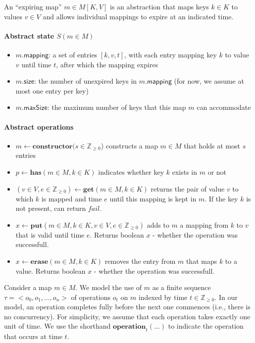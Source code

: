 \documentclass{article}
\renewcommand{\o}[1]{\ensuremath{\mathbf{#1}}}
\newcommand{\s}[1]{\ensuremath{\mathsf{#1}}}
\newcommand{\nintset}{\ensuremath{\mathds{Z}_{\ge 0}}}
\begin{document}
An ``expiring map'' $m \in M[K,V]$ is an abstraction that maps keys $k \in K$ to values $v \in V$ and allows individual mappings to expire at an indicated time.

\paragraph{Abstract state $S(m\in M)$}
\begin{itemize}
   \item $m$.\s{mapping}: a set of entries $[k,v,t]$, with each entry mapping key $k$ to value $v$ until time $t$, after which the mapping expires
   \item $m$.\s{size}: the number of unexpired keys in $m$.\s{mapping} (for now, we assume at most one entry per key)
   \item $m$.\s{maxSize}: the maximum number of keys that this map $m$ can accommodate
\end{itemize}

\paragraph{Abstract operations}
\begin{itemize}
\item $m \gets \o{constructor}(s \in \nintset$) constructs a map $m\in M$ that holds at most $s$ entries
\item $p\gets \o{has}(m \in M, k \in K)$ indicates whether key $k$ exists in $m$ or not
\item $(v\in V, e\in \nintset)\gets \o{get}(m \in M, k \in K)$ returns the pair of value $v$ to which $k$ is mapped and time $e$ until this mapping is kept in $m$. If the key $k$ is not present, can return $fail$.
\item $x\gets \o{put}(m \in M, k \in K, v \in V, e \in \nintset)$ adds to $m$ a mapping from $k$ to $v$ that is valid until time $e$. Returns boolean $x$ - whether the operation was successfull.
\item $x\gets \o{erase}(m\in M, k \in K)$ removes the entry from $m$ that maps $k$ to a value. Returns boolean $x$ - whether the operation was successfull.
\end{itemize}

Consider a map $m\in M$.  We model the use of $m$ as a finite sequence
$\tau = <o_0, o_1, ..., o_n>$
of operations $o_t$ on $m$ indexed by time $t \in \nintset$.
In our model, an operation completes fully before the next one commences (i.e., there is no concurrency).
For simplicity, we assume that each operation takes exactly one unit of time.
We use the shorthand $\o{operation}_t(...)$ to indicate the operation that occurs at time $t$.
\end{document}

